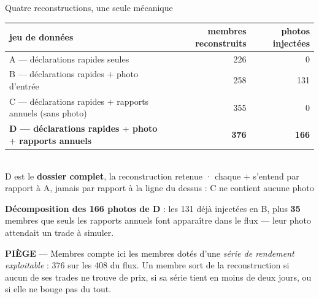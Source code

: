 \documentclass[11pt,aspectratio=169]{beamer}
\newcommand{\defl}[1]{{\scriptsize\color{black!55}#1}}
\newcommand{\piege}[1]{%
  \colorbox{warnorange!12}{\parbox{\dimexpr\linewidth-8pt}{\scriptsize
    \textbf{\textcolor{warnorange}{PIÈGE}}\; --- #1}}}
\begin{document}
\begin{frame}{Quatre reconstructions, une seule mécanique}
  \centering\footnotesize
  \begin{tabular}{lrr}
    \toprule
    jeu de données & membres reconstruits & photos injectées\\
    \midrule
    A --- déclarations rapides seules                          & 226 & 0\\
    B --- déclarations rapides $+$ photo d'entrée              & 258 & 131\\
    C --- déclarations rapides $+$ rapports annuels (sans photo) & 355 & 0\\
    \textbf{D --- déclarations rapides $+$ photo $+$ rapports annuels} & \textbf{376} & \textbf{166}\\
    \bottomrule
  \end{tabular}\\[1.5mm]
  \defl{D est le \textbf{dossier complet}, la reconstruction retenue · chaque \og{}$+$\fg{} s'entend
  par rapport à A, jamais par rapport à la ligne du dessus : C ne contient aucune photo}\\[3mm]
  \raggedright\scriptsize
  \textbf{Décomposition des 166 photos de D} : les 131 déjà injectées en B, plus \textbf{35} membres
  que seuls les rapports annuels font apparaître dans le flux --- leur photo attendait un trade à
  simuler.\\[2mm]
  \piege{\og{}Membres\fg{} compte ici les membres dotés d'une \emph{série de rendement exploitable} :
  376 sur les 408 du flux. Un membre sort de la reconstruction si aucun de ses trades ne trouve de
  prix, si sa série tient en moins de deux jours, ou si elle ne bouge pas du tout.}
\end{frame}
\end{document}
